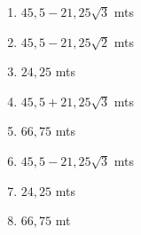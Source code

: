 \documentclass[10 pt,usenames,dvipsnames, oneside]{article}
\begin{document}
\ifdefined\prof
\begin{solucao}

\begin{enumerate}
\item $45{,}5-21,25\sqrt{3}$ mts
\item $45{,}5-21,25\sqrt{2}$ mts
\item $24{,}25$ mts
\item $45{,}5+21,25\sqrt{3}$ mts
\item $66{,}75$ mts
\item $45{,}5-21,25\sqrt{3}$ mts
\item $24{,}25$ mts
\item $66{,}75$ mt
\end{enumerate}

\end{solucao}
\fi
\end{document}
